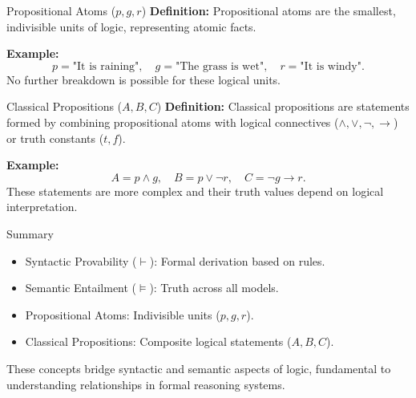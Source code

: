 \documentclass{beamer} %
\begin{document}
\begin{frame}{Propositional Atoms (\( p, g, r \))}
    \textbf{Definition:}  
    Propositional atoms are the smallest, indivisible units of logic, representing atomic facts.  

    \textbf{Example:}
    \[
        p = \text{"It is raining"}, \quad g = \text{"The grass is wet"}, \quad r = \text{"It is windy"}.
    \]
    No further breakdown is possible for these logical units.
\end{frame}

\begin{frame}{Classical Propositions (\( A, B, C \))}
    \textbf{Definition:}  
    Classical propositions are statements formed by combining propositional atoms with logical connectives (\( \land, \lor, \lnot, \rightarrow \)) or truth constants (\( t, f \)).  

    \textbf{Example:}
    \[
        A = p \land g, \quad B = p \lor \lnot r, \quad C = \lnot g \rightarrow r.
    \]
    These statements are more complex and their truth values depend on logical interpretation.
\end{frame}

\begin{frame}{Summary}
    \begin{itemize}
        \item Syntactic Provability (\( \vdash \)): Formal derivation based on rules.  
        \item Semantic Entailment (\( \vDash \)): Truth across all models.
        \item Propositional Atoms: Indivisible units (\( p, g, r \)).  
        \item Classical Propositions: Composite logical statements (\( A, B, C \)).  
    \end{itemize}

    \vspace{0.5cm}
    These concepts bridge syntactic and semantic aspects of logic, fundamental to understanding relationships in formal reasoning systems.
\end{frame}
\end{document}
